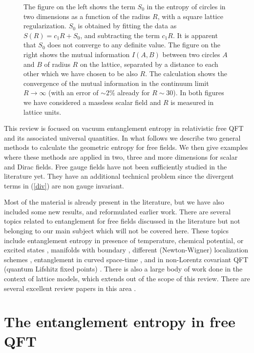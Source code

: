 \documentclass[a4paper]{article}
\begin{document}
\begin{figure} [tbp]
\leavevmode
\centering
\epsfxsize=15.8cm
\bigskip
{}
\caption{The figure on the left shows the term $S_0$ in the entropy of circles in two dimensions as a function of the  radius $R$, with a square lattice regularization. $S_0$ is obtained by fitting the data as $S(R)=c_1 R+ S_0$, and subtracting the term $c_1 R$. It is apparent that $S_0$ does not converge to any definite value. The figure on the right shows the mutual information $I(A,B)$ between two circles $A$ and $B$ of radius $R$ on the lattice, separated by a distance to each other which we have chosen to be also $R$. The calculation shows the convergence of the mutual information in the continuum limit $R\rightarrow\infty$ (with an error of $\sim 2\%$ already for $R\sim 30$). In both figures we have considered a massless scalar field and  $R$ is measured in lattice units. }
\label{figu0}
\end{figure}

This review is focused on vacuum entanglement entropy in relativistic free QFT and its associated universal quantities.  In what follows we describe two general methods to calculate the geometric entropy for free fields. We then give examples where these methods are applied in two, three and more dimensions for scalar and Dirac fields. Free gauge fields have not been sufficiently studied in the literature yet. They have an additional technical problem since the divergent terms in (\ref{div}) are non gauge invariant. 

Most of the material is already present in the literature, but we have also included some new results, and reformulated earlier work.  
There are several topics related to entanglement for free fields discussed in the literature but not belonging to our main subject which will not be covered here. These topics include entanglement entropy in presence of  temperature, chemical potential, or excited states \cite{cc,fermionic1,kor,otrosfermionic}, manifolds with boundary \cite{frolovangulo,dc,sh,met}, different (Newton-Wigner) localization schemes \cite{nw}, entanglement in curved space-time \cite{dos,ii}, and in non-Lorentz covariant QFT (quantum Lifshitz fixed points) \cite{frad}. There is also a large body of work done in the context of lattice models, which extends out of the scope of this review. There are several excellent review papers in this area \cite{ami,ecp,pesc}.   

\section{The entanglement entropy in free QFT}
\end{document}
